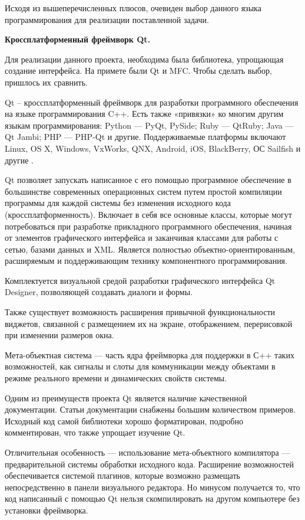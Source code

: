 Исходя из вышеперечисленных плюсов, очевиден выбор данного языка программирования для реализации поставленной задачи.

\newpage
\noindent\textbf{Кроссплатформенный фреймворк Qt.}

Для реализации данного проекта, необходима была библиотека, упрощающая создание интерфейса. На примете были Qt и MFC. Чтобы сделать выбор, пришлось их сравнить. 

Qt – кроссплатформенный фреймворк для разработки программного обеспечения на языке программирования C++. Есть также «привязки» ко многим другим языкам программирования: Python — PyQt, PySide; Ruby — QtRuby; Java — Qt Jambi; PHP — PHP-Qt и другие. Поддерживаемые платформы включают Linux, OS X, Windows, VxWorks, QNX, Android, iOS, BlackBerry, ОС Sailfish и другие \cite{Qt}.

Qt позволяет запускать написанное с его помощью программное обеспечение в большинстве современных операционных систем путем простой компиляции программы для каждой системы без изменения исходного кода (кроссплатформенность). Включает в себя все основные классы, которые могут потребоваться при разработке прикладного программного обеспечения, начиная от элементов графического интерфейса и заканчивая классами для работы с сетью, базами данных и XML. Является полностью объектно-ориентированным, расширяемым и поддерживающим технику компонентного программирования.

Комплектуется визуальной средой разработки графического интерфейса Qt Designer, позволяющей создавать диалоги и формы.

Также существует возможность расширения привычной функциональности виджетов, связанной с размещением их на экране, отображением, перерисовкой при изменении размеров окна.

Мета-объектная система — часть ядра фреймворка для поддержки в С++ таких возможностей, как сигналы и слоты для коммуникации между объектами в режиме реального времени и динамических свойств системы.

Одним из преимуществ проекта Qt является наличие качественной документации. Статьи документации снабжены большим количеством примеров. Исходный код самой библиотеки хорошо форматирован, подробно комментирован, что также упрощает изучение Qt.

Отличительная особенность — использование мета-объектного компилятора — предварительной системы обработки исходного кода. Расширение возможностей обеспечивается системой плагинов, которые возможно размещать непосредственно в панели визуального редактора. Но минусом получается то, что код написанный с помощью Qt нельзя скомпилировать на другом компьютере без установки фреймворка.

